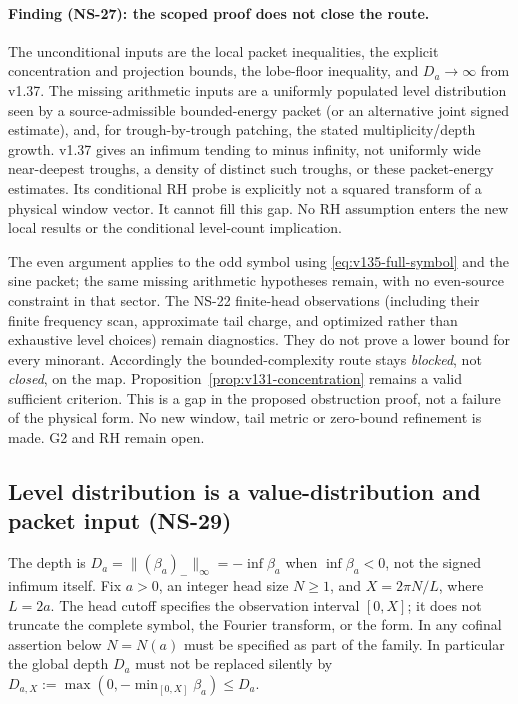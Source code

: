 \documentclass[11pt]{article}
\theoremstyle{remark}
\begin{document}
\paragraph{Finding (NS-27): the scoped proof does not close the route.}
The unconditional inputs are the local packet inequalities, the explicit
concentration and projection bounds, the lobe-floor inequality, and
$D_a\to\infty$ from v1.37. The missing arithmetic inputs are a
uniformly populated level distribution seen by a source-admissible
bounded-energy packet (or an alternative joint signed estimate), and,
for trough-by-trough patching, the stated multiplicity/depth growth.
v1.37 gives an infimum tending to minus infinity, not uniformly wide
near-deepest troughs, a density of distinct such troughs, or these
packet-energy estimates. Its conditional RH probe is explicitly not
a squared transform of a physical window vector. It cannot fill this
gap. No RH assumption enters the new local results or the conditional
level-count implication.

The even argument applies to the odd symbol using
\eqref{eq:v135-full-symbol} and the sine packet; the same missing
arithmetic hypotheses remain, with no even-source constraint in that
sector. The NS-22 finite-head observations (including their finite
frequency scan, approximate tail charge, and optimized rather than
exhaustive level choices) remain diagnostics. They do not prove a
lower bound for every minorant. Accordingly the bounded-complexity
route stays \emph{blocked}, not \emph{closed}, on the map.
Proposition~\ref{prop:v131-concentration} remains a valid sufficient
criterion. This is a gap in the proposed obstruction proof, not a
failure of the physical form. No new window, tail metric or zero-bound
refinement is made. G2 and RH remain open.

\subsection*{Level distribution is a value-distribution and packet input (NS-29)}

The depth is $D_a=\| (\beta_a)_-\|_\infty=-\inf\beta_a$ when
$\inf\beta_a<0$, not the signed infimum itself. Fix $a>0$, an integer
head size $N\ge1$, and $X=2\pi N/L$, where $L=2a$. The head cutoff
specifies the observation interval $[0,X]$; it does not truncate the
complete symbol, the Fourier transform, or the form. In any cofinal
assertion below $N=N(a)$ must be specified as part of the family.
In particular the global depth $D_a$ must not be replaced silently by
$D_{a,X}:=\max(0,-\min_{[0,X]}\beta_a)\le D_a$.
\end{document}
